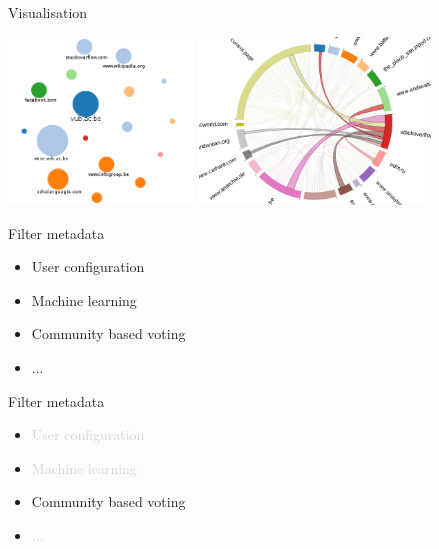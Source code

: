 \begin{frame}
	\begin{block}{Visualisation}
		\begin{center}
			\includegraphics[width=0.37\textwidth]{./images/vis1.png}\hspace{0.1cm}
			\includegraphics[width=0.46\textwidth]{./images/vis2.png}
		\end{center}
	\end{block}
\end{frame}

\begin{frame}
	\begin{block}{Filter metadata}
		\begin{itemize}
			\item User configuration
			\item Machine learning
			\item Community based voting
			\item ...
		\end{itemize}
	\end{block}
\end{frame}

\begin{frame}
	\begin{block}{Filter metadata}
		\begin{itemize}
			\item \textcolor{lightgray}{User configuration}
			\item \textcolor{lightgray}{Machine learning}
			\item Community based voting
			\item \textcolor{lightgray}{...}
		\end{itemize}
	\end{block}
\end{frame}


